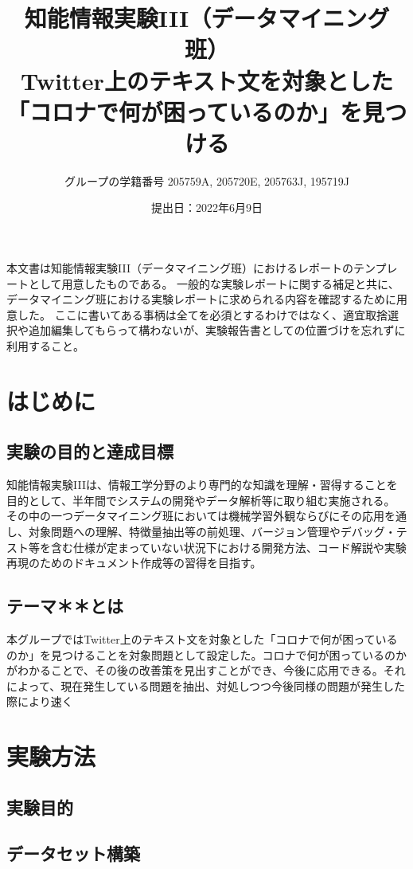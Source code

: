 \documentclass[a4paper, 11pt, titlepage]{jsarticle}
\title{知能情報実験III（データマイニング班）\\Twitter上のテキスト文を対象とした「コロナで何が困っているのか」を見つける}
\author{グループの学籍番号 205759A, 205720E, 205763J, 195719J}
\date{提出日：2022年6月9日}
\begin{document}
\maketitle
\tableofcontents
\clearpage

本文書は知能情報実験III（データマイニング班）におけるレポートのテンプレートとして用意したものである。
一般的な実験レポートに関する補足と共に、データマイニング班における実験レポートに求められる内容を確認するために用意した。
ここに書いてある事柄は全てを必須とするわけではなく、適宜取捨選択や追加編集してもらって構わないが、実験報告書としての位置づけを忘れずに利用すること。

\section{はじめに}
\subsection{実験の目的と達成目標}
知能情報実験IIIは、情報工学分野のより専門的な知識を理解・習得することを目的として、半年間でシステムの開発やデータ解析等に取り組む実施される。
その中の一つデータマイニング班においては機械学習外観ならびにその応用を通し、対象問題への理解、特徴量抽出等の前処理、バージョン管理やデバッグ・テスト等を含む仕様が定まっていない状況下における開発方法、コード解説や実験再現のためのドキュメント作成等の習得を目指す。

\subsection{テーマ＊＊とは}
本グループではTwitter上のテキスト文を対象とした「コロナで何が困っているのか」を見つけることを対象問題として設定した。コロナで何が困っているのかがわかることで、その後の改善策を見出すことができ、今後に応用できる。それによって、現在発生している問題を抽出、対処しつつ今後同様の問題が発生した際により速く

\section{実験方法}
\subsection{実験目的}


\subsection{データセット構築}
\end{document}
